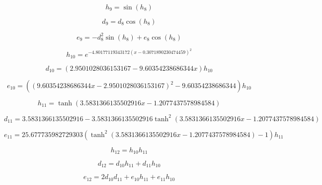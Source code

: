 \begin{equation}
h_{9}=\sin{\left(h_{8} \right)}
\end{equation}


\begin{equation}
d_{9}=d_{8} \cos{\left(h_{8} \right)}
\end{equation}


\begin{equation}
e_{9}=- d_{8}^{2} \sin{\left(h_{8} \right)} + e_{8} \cos{\left(h_{8} \right)}
\end{equation}


\begin{equation}
h_{10}=e^{- 4.80177119343172 \left(x - 0.3071890230474459\right)^{2}}
\end{equation}


\begin{equation}
d_{10}=\left(2.9501028036153167 - 9.60354238686344 x\right) h_{10}
\end{equation}


\begin{equation}
e_{10}=\left(\left(9.60354238686344 x - 2.9501028036153167\right)^{2} - 9.60354238686344\right) h_{10}
\end{equation}


\begin{equation}
h_{11}=\tanh{\left(3.5831366135502916 x - 1.2077437578984584 \right)}
\end{equation}


\begin{equation}
d_{11}=3.5831366135502916 - 3.5831366135502916 \tanh^{2}{\left(3.5831366135502916 x - 1.2077437578984584 \right)}
\end{equation}


\begin{equation}
e_{11}=25.677735982729303 \left(\tanh^{2}{\left(3.5831366135502916 x - 1.2077437578984584 \right)} - 1\right) h_{11}
\end{equation}


\begin{equation}
h_{12}=h_{10} h_{11}
\end{equation}


\begin{equation}
d_{12}=d_{10} h_{11} + d_{11} h_{10}
\end{equation}


\begin{equation}
e_{12}=2 d_{10} d_{11} + e_{10} h_{11} + e_{11} h_{10}
\end{equation}


